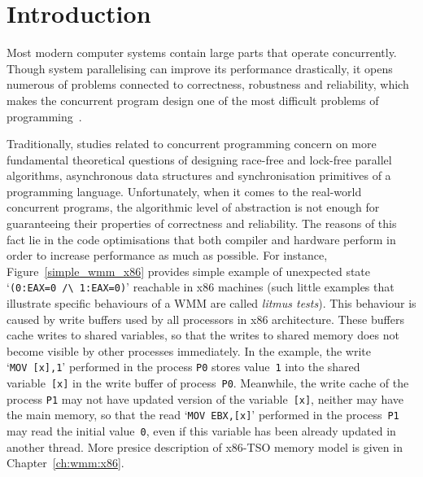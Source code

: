 \chapter{Introduction}
\label{ch:intro}

Most modern computer systems contain large parts that operate concurrently. Though system parallelising can improve its performance drastically, it opens numerous of problems connected to correctness, robustness and reliability, which makes the concurrent program design one of the most difficult problems of programming~\cite{mckenney2017parallel}.

Traditionally, studies related to concurrent programming concern on more fundamental theoretical questions of designing race-free and lock-free parallel algorithms, asynchronous data structures and synchronisation primitives of a programming language. Unfortunately,
when it comes to 
the real-world concurrent programs, the algorithmic level of abstraction is not enough for guaranteeing their properties of correctness and reliability. The reasons of this fact lie in the code optimisations that both compiler and hardware perform in order to increase performance as much as possible. For instance, Figure~\ref{simple_wmm_x86} provides simple example of
unexpected state `\texttt{(0:EAX=0~/\textbackslash~1:EAX=0)}' reachable in x86 machines (such little examples that illustrate specific behaviours of a WMM are called \textit{litmus tests}).
This behaviour is caused by write buffers used by all processors in x86 architecture. These buffers cache writes to shared variables, so that the writes to shared memory does not become visible by other processes immediately. In the example, the write `\texttt{MOV~[x],1}' performed in the process \texttt{P0} stores value~\texttt{1} into the shared variable~\texttt{[x]} in the write buffer of process~\texttt{P0}. Meanwhile, the write cache of the process \texttt{P1} may not have updated version of the variable~\texttt{[x]}, neither may have the main memory, so that the read `\texttt{MOV~EBX,[x]}' performed in the process~\texttt{P1} may read the initial value~\texttt{0}, even if this variable has been already updated in another thread. More presice description of x86-TSO memory model is given in Chapter~\ref{ch:wmm:x86}.

